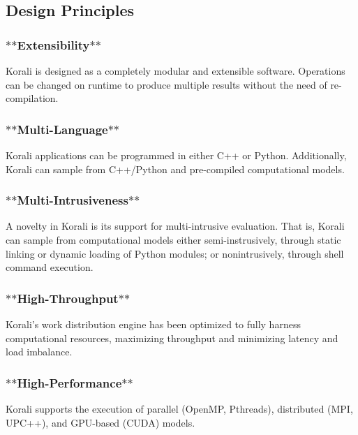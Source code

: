 \subsection*{Design Principles}

\subsubsection*{$\ast$$\ast$\-Extensibility$\ast$$\ast$}

Korali is designed as a completely modular and extensible software. Operations can be changed on runtime to produce multiple results without the need of re-\/compilation.

\subsubsection*{$\ast$$\ast$\-Multi-\/\-Language$\ast$$\ast$}

Korali applications can be programmed in either C++ or Python. Additionally, Korali can sample from C++/\-Python and pre-\/compiled computational models.

\subsubsection*{$\ast$$\ast$\-Multi-\/\-Intrusiveness$\ast$$\ast$}

A novelty in Korali is its support for multi-\/intrusive evaluation. That is, Korali can sample from computational models either semi-\/instrusively, through static linking or dynamic loading of Python modules; or nonintrusively, through shell command execution.

\subsubsection*{$\ast$$\ast$\-High-\/\-Throughput$\ast$$\ast$}

Korali's work distribution engine has been optimized to fully harness computational resources, maximizing throughput and minimizing latency and load imbalance.

\subsubsection*{$\ast$$\ast$\-High-\/\-Performance$\ast$$\ast$}

Korali supports the execution of parallel (Open\-M\-P, Pthreads), distributed (M\-P\-I, U\-P\-C++), and G\-P\-U-\/based (C\-U\-D\-A) models.

